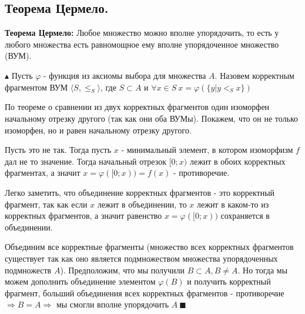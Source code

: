 \subsection{Теорема Цермело.}
\par \textbf{Теорема Цермело:} Любое множество можно вполне упорядочить, то есть у любого множества есть равномощное ему вполне упорядоченное множество (ВУМ).
\par $\blacktriangle$ Пусть $\varphi$ - функция из аксиомы выбора для множества $A$. Назовем корректным фрагментом ВУМ $\langle S, \leq_S \rangle$, где $S \subset A$ и $\forall x \in S \: x=\varphi(\{y|y <_S x\})$
\par По теореме о сравнении из двух корректных фрагментов один изоморфен начальному отрезку другого (так как они оба ВУМы). Покажем, что он не только изоморфен, но и равен начальному отрезку другого. 
\par Пусть это не так. Тогда пусть $x$ - минимальный элемент, в котором изоморфизм $f$ дал не то значение. Тогда начальный отрезок $[0;x)$ лежит в обоих корректных фрагментах, а значит $x=\varphi([0;x))=f(x)$ - противоречие.
\par Легко заметить, что объединение корректных фрагментов - это корректный фрагмент, так как если $x$ лежит в объединении, то $x$ лежит в каком-то из корректных фрагментов, а значит равенство $x=\varphi([0;x))$ сохраняется в объединении.
\par Объединим все корректные фрагменты (множество всех корректных фрагментов существует так как оно является подмножеством множества упорядоченных подмножеств $A$). Предположим, что мы получили $B \subset A, B \neq A$. Но тогда мы можем дополнить объединение элементом $\varphi(B)$ и получить корректный фрагмент, больший объединения всех корректных фрагментов - противоречие $\Rightarrow B=A \Rightarrow$ мы смогли вполне упорядочить $A \: \blacksquare$


